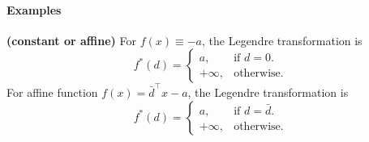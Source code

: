 \documentclass{article}
\newcommand{\bfs}[1]{\textbf{({#1}) }}
\begin{document}
\paragraph{Examples}
\begin{exma}\bfs{constant or affine}\label{rem:hbkfka}
For $f(x) \equiv-a$, the Legendre transformation  is 
\begin{equation}
  f^*(d)=\begin{cases}
    a, & \text{if $d=0$}.\\
    +\infty, & \text{otherwise}.
  \end{cases}
\end{equation}
For affine function $f(x) = \bar{d}^{\top} x-a$, the Legendre transformation  is 
\begin{equation}
  f^*(d)=\begin{cases}
    a, & \text{if $d=\bar{d}$}.\\
    +\infty, & \text{otherwise}.
  \end{cases}
\end{equation}
\end{exma}
\end{document}

